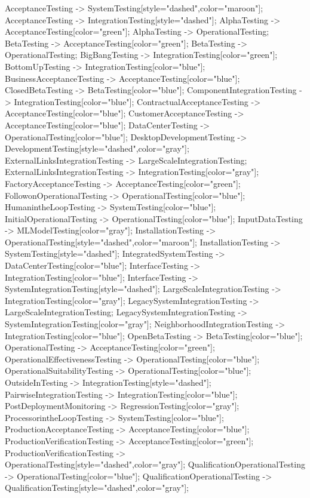 \documentclass{article}
\begin{document}
{AcceptanceTesting -> SystemTesting[style="dashed",color="maroon"];
AcceptanceTesting -> IntegrationTesting[style="dashed"];
AlphaTesting -> AcceptanceTesting[color="green"];
AlphaTesting -> OperationalTesting;
BetaTesting -> AcceptanceTesting[color="green"];
BetaTesting -> OperationalTesting;
BigBangTesting -> IntegrationTesting[color="green"];
BottomUpTesting -> IntegrationTesting[color="blue"];
BusinessAcceptanceTesting -> AcceptanceTesting[color="blue"];
ClosedBetaTesting -> BetaTesting[color="blue"];
ComponentIntegrationTesting -> IntegrationTesting[color="blue"];
ContractualAcceptanceTesting -> AcceptanceTesting[color="blue"];
CustomerAcceptanceTesting -> AcceptanceTesting[color="blue"];
DataCenterTesting -> OperationalTesting[color="blue"];
DesktopDevelopmentTesting -> DevelopmentTesting[style="dashed",color="gray"];
ExternalLinksIntegrationTesting -> LargeScaleIntegrationTesting;
ExternalLinksIntegrationTesting -> IntegrationTesting[color="gray"];
FactoryAcceptanceTesting -> AcceptanceTesting[color="green"];
FollowonOperationalTesting -> OperationalTesting[color="blue"];
HumanintheLoopTesting -> SystemTesting[color="blue"];
InitialOperationalTesting -> OperationalTesting[color="blue"];
InputDataTesting -> MLModelTesting[color="gray"];
InstallationTesting -> OperationalTesting[style="dashed",color="maroon"];
InstallationTesting -> SystemTesting[style="dashed"];
IntegratedSystemTesting -> DataCenterTesting[color="blue"];
InterfaceTesting -> IntegrationTesting[color="blue"];
InterfaceTesting -> SystemIntegrationTesting[style="dashed"];
LargeScaleIntegrationTesting -> IntegrationTesting[color="gray"];
LegacySystemIntegrationTesting -> LargeScaleIntegrationTesting;
LegacySystemIntegrationTesting -> SystemIntegrationTesting[color="gray"];
NeighborhoodIntegrationTesting -> IntegrationTesting[color="blue"];
OpenBetaTesting -> BetaTesting[color="blue"];
OperationalTesting -> AcceptanceTesting[color="green"];
OperationalEffectivenessTesting -> OperationalTesting[color="blue"];
OperationalSuitabilityTesting -> OperationalTesting[color="blue"];
OutsideInTesting -> IntegrationTesting[style="dashed"];
PairwiseIntegrationTesting -> IntegrationTesting[color="blue"];
PostDeploymentMonitoring -> RegressionTesting[color="gray"];
ProcessorintheLoopTesting -> SystemTesting[color="blue"];
ProductionAcceptanceTesting -> AcceptanceTesting[color="blue"];
ProductionVerificationTesting -> AcceptanceTesting[color="green"];
ProductionVerificationTesting -> OperationalTesting[style="dashed",color="gray"];
QualificationOperationalTesting -> OperationalTesting[color="blue"];
QualificationOperationalTesting -> QualificationTesting[style="dashed",color="gray"];
}
\end{document}
